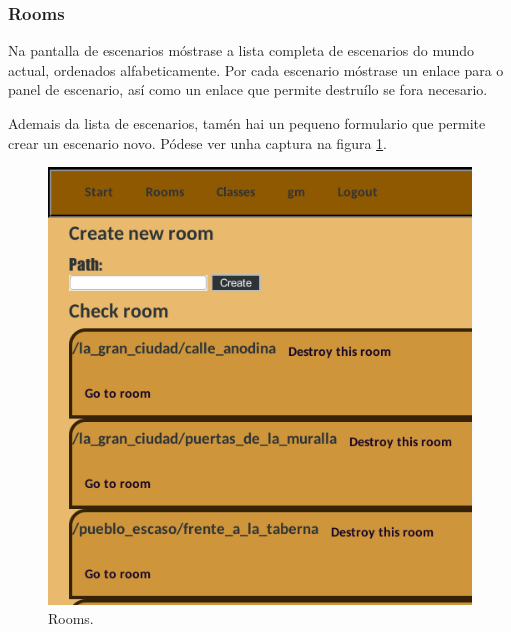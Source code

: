 \subsubsection{Rooms}
Na pantalla de escenarios móstrase a lista completa de escenarios do mundo
actual, ordenados alfabeticamente. Por cada escenario móstrase un enlace para o
panel de escenario, así como un enlace que permite destruílo se fora necesario.
\par
Ademais da lista de escenarios, tamén hai un pequeno formulario que permite
crear un escenario novo. Pódese ver unha captura na figura
\ref{fig:demiurgorooms}.

\begin{figure}
\centerline{\includegraphics{figuras/demiurgo_rooms.png}}
\caption{Rooms.}
\label{fig:demiurgorooms}
\end{figure}


